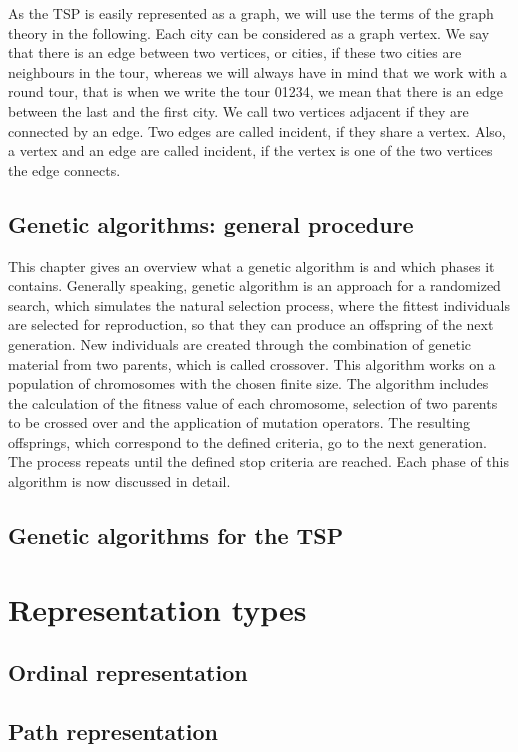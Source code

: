 \documentclass[a4paper, 12pt, headings=standardclasses]{scrartcl}
\begin{document}
As the TSP is easily represented as a graph, we will use the terms of the graph theory in the following. Each city can be considered as a graph vertex. We say that there is an edge between two vertices, or cities, if these two cities are neighbours in the tour, whereas we will always have in mind that we work with a round tour, that is when we  write the tour 01234, we mean that there is an edge between the last and the first city. We call two vertices adjacent if they are connected by an edge. Two edges are called incident, if they share a vertex. Also, a vertex and an edge are called incident, if the vertex is one of the two vertices the edge connects.


\subsection{Genetic algorithms: general procedure}
This chapter gives an overview what a genetic algorithm is and which phases it contains.
Generally speaking, genetic algorithm is an approach for a randomized search, which simulates the natural selection process, where the fittest individuals are selected for reproduction, so that they can produce an offspring of the next generation. New individuals are created through the combination of genetic material from two parents, which is called crossover. This algorithm works on a population of chromosomes with the chosen finite size. The algorithm includes the calculation of the fitness value of each chromosome, selection of two parents to be crossed over and the application of mutation operators. The resulting offsprings, which correspond to the defined criteria, go to the next generation. The process repeats until the defined stop criteria are reached. Each phase of this algorithm is now discussed in detail.\par
\subsection{Genetic algorithms for the TSP}



\section{Representation types}
\subsection{Ordinal representation}
\subsection{Path representation}
\end{document}
